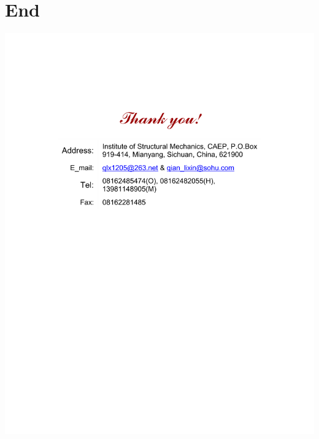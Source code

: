 \documentclass[slidestop,compress,mathserif,UTF8]{beamer}
\numberwithin{equation}{section}                                %
\begin{document}
    \section*{End}
        \begin{frame}
            \vspace{35mm}
            \centering
                \includegraphics{Thanks.pdf}
        \end{frame}
\end{document}
